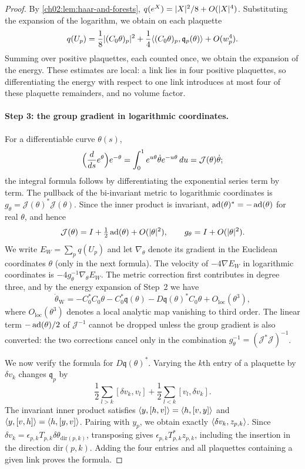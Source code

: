 \begin{proof}
By \cref{ch02:lem:haar-and-forests}, $q(e^X)=\lvert X\rvert^2/8+O(\lvert X\rvert^4)$. Substituting the expansion of the logarithm, we obtain on each plaquette
\[
 q(U_p)=\frac18\lvert (C_0\theta)_p\rvert^2+\frac14\langle (C_0\theta)_p,\mathfrak q_p(\theta)\rangle+O(w_p^4).
\]
Summing over positive plaquettes, each counted once, we obtain the expansion of the energy. These estimates are local: a link lies in four positive plaquettes, so differentiating the energy with respect to one link introduces at most four of these plaquette remainders, and no volume factor.

\paragraph{Step 3: the group gradient in logarithmic coordinates.}
For a differentiable curve $\theta(s)$,
\[
 \Bigl(\frac{d}{ds}e^{\theta}\Bigr)e^{-\theta}=\int_0^1e^{u\theta}\dot\theta e^{-u\theta}\,du=\mathcal J(\theta)\dot\theta ;
\]
the integral formula follows by differentiating the exponential series term by term. The pullback of the bi-invariant metric to logarithmic coordinates is $g_\theta=\mathcal J(\theta)^*\mathcal J(\theta)$. Since the inner product is invariant, $\operatorname{ad}(\theta)^*=-\operatorname{ad}(\theta)$ for real $\theta$, and hence
\[
 \mathcal J(\theta)=I+\tfrac12\operatorname{ad}(\theta)+O(\lvert \theta\rvert^2),\qquad g_\theta=I+O(\lvert \theta\rvert^2).
\]
We write $E_W=\sum_pq(U_p)$ and let $\nabla_\theta$ denote its gradient in the Euclidean coordinates $\theta$ (only in the next formula). The velocity of $-4\nabla E_W$ in logarithmic coordinates is $-4g_\theta^{-1}\nabla_\theta E_W$. The metric correction first contributes in degree three, and by the energy expansion of Step~2 we have
\begin{equation}\label{ch21:eq:wilson-coordinate-force}
 \dot\theta_{\mathrm W}=-C_0^*C_0\theta-C_0^*\mathfrak q(\theta)-D\mathfrak q(\theta)^*C_0\theta+O_{\mathrm{loc}}(\theta^3),
\end{equation}
where $O_{\mathrm{loc}}(\theta^3)$ denotes a local analytic map vanishing to third order. The linear term $-\operatorname{ad}(\theta)/2$ of $\mathcal J^{-1}$ cannot be dropped unless the group gradient is also converted: the two corrections cancel only in the combination $g_\theta^{-1}=(\mathcal J^*\mathcal J)^{-1}$.

We now verify the formula for $D\mathfrak q(\theta)^*$. Varying the $k$th entry of a plaquette by $\delta v_k$ changes $\mathfrak q_p$ by
\[
 \frac12\sum_{l>k}[\delta v_k,v_l]+\frac12\sum_{l<k}[v_l,\delta v_k].
\]
The invariant inner product satisfies $\langle y,[h,v]\rangle=\langle h,[v,y]\rangle$ and $\langle y,[v,h]\rangle=\langle h,[y,v]\rangle$. Pairing with $y_p$, we obtain exactly $\langle \delta v_k,z_{p,k}\rangle$. Since $\delta v_k=\epsilon_{p,k}T_{p,k}\delta\theta_{\mathrm{dir}(p,k)}$, transposing gives $\epsilon_{p,k}T_{p,k}^*z_{p,k}$, including the insertion in the direction $\mathrm{dir}(p,k)$. Adding the four entries and all plaquettes containing a given link proves the formula.


\end{proof}
